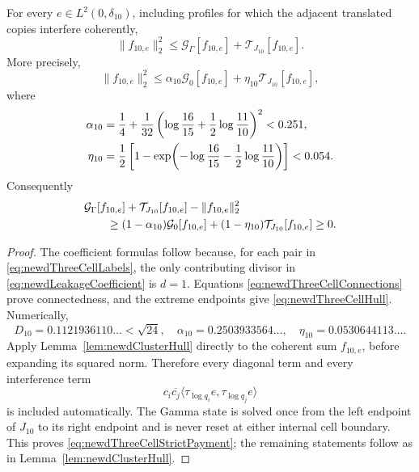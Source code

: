 \begin{theorem}
\label{thm:newdThreeCellCluster}
For every $e\in L^2(0,\delta_{10})$, including profiles for which the
adjacent translated copies interfere coherently,
\begin{equation}\label{eq:newdThreeCellPayment}
 \|f_{10,e}\|_2^2
 \leq\mathcal G_\Gamma[f_{10,e}]
      +\mathcal T_{J_{10}}[f_{10,e}].
\end{equation}
More precisely,
\begin{equation}\label{eq:newdThreeCellStrictPayment}
 \|f_{10,e}\|_2^2
 \leq\alpha_{10}\mathcal G_0[f_{10,e}]
      +\eta_{10}\mathcal T_{J_{10}}[f_{10,e}],
\end{equation}
where
\begin{align}
 \alpha_{10}
 &=\frac14+\frac1{32}
   \left(\log\frac{16}{15}
        +\frac12\log\frac{11}{10}\right)^2
   <0.251,\notag\\
 \eta_{10}
 &=\frac12\left[1-
   \exp\!\left(-\log\frac{16}{15}
               -\frac12\log\frac{11}{10}\right)\right]
   <0.054.                                                   
 \label{eq:newdThreeCellConstants}
\end{align}
Consequently
\begin{align}
 &\mathcal G_\Gamma[f_{10,e}]
  +\mathcal T_{J_{10}}[f_{10,e}]-\|f_{10,e}\|_2^2
 \notag\\
 &\qquad\geq
 (1-\alpha_{10})\mathcal G_0[f_{10,e}]
 +(1-\eta_{10})\mathcal T_{J_{10}}[f_{10,e}]\geq0.
 \label{eq:newdThreeCellRemainder}
\end{align}
\end{theorem}

\begin{proof}
The coefficient formulas follow because, for each pair in
\eqref{eq:newdThreeCellLabels}, the only contributing divisor in
\eqref{eq:newdLeakageCoefficient} is $d=1$.  Equations
\eqref{eq:newdThreeCellConnections} prove connectedness, and the extreme
endpoints give \eqref{eq:newdThreeCellHull}.  Numerically,
\[
 D_{10}=0.1121936110\ldots<\sqrt{24},
 \quad
 \alpha_{10}=0.2503933564\ldots,
 \quad
 \eta_{10}=0.0530644113\ldots.
\]
Apply Lemma~\ref{lem:newdClusterHull} directly to the coherent sum
$f_{10,e}$, before expanding its squared norm.  Therefore every diagonal
term and every interference term
\[
 c_i\overline{c_j}
 \langle\tau_{\log q_i}e,\tau_{\log q_j}e\rangle
\]
is included automatically.  The Gamma state is solved once from the left
endpoint of $J_{10}$ to its right endpoint and is never reset at either
internal cell boundary.  This proves
\eqref{eq:newdThreeCellStrictPayment}; the remaining statements follow as
in Lemma~\ref{lem:newdClusterHull}.
\end{proof}

